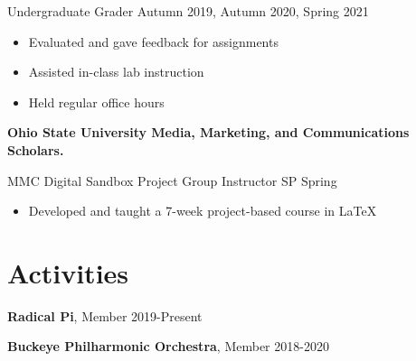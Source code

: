 \documentclass[10pt]{moderncv}
\begin{document}
Undergraduate Grader
\hfill Autumn 2019, Autumn 2020, Spring 2021
\begin{itemize}
    \item Evaluated and gave feedback for assignments
    \item Assisted in-class lab instruction
    \item Held regular office hours
\end{itemize}

\textbf{Ohio State University Media, Marketing, and Communications Scholars.}

MMC Digital Sandbox Project Group Instructor
\hfill SP Spring
\begin{itemize}
    \item Developed and taught a 7-week project-based course in LaTeX
\end{itemize}

\section*{Activities}

\textbf{Radical Pi}, Member \hfill 2019-Present

\textbf{Buckeye Philharmonic Orchestra}, Member \hfill 2018-2020
\end{document}
